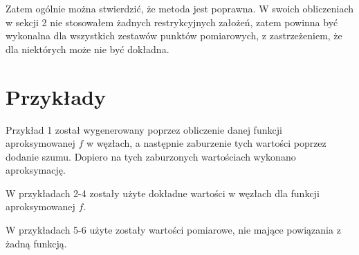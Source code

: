 \documentclass[12pt]{article}
\begin{document}
	Zatem ogólnie można stwierdzić, że metoda jest poprawna. W swoich obliczeniach w sekcji 2 nie stosowałem żadnych restrykcyjnych założeń, zatem powinna być wykonalna dla wszystkich zestawów punktów pomiarowych, z zastrzeżeniem, że dla niektórych może nie być dokładna.
	
	
	
	
	\section{Przykłady}
	Przykład 1 został wygenerowany poprzez obliczenie danej funkcji aproksymowanej $f$ w węzłach, a następnie zaburzenie tych wartości poprzez dodanie szumu. Dopiero na tych zaburzonych wartościach wykonano aproksymację.
	
	W przykładach 2-4 zostały użyte dokładne wartości w węzłach dla funkcji aproksymowanej $f$.
	
	W przykładach 5-6 użyte zostały wartości pomiarowe, nie mające powiązania z żadną funkcją.
	
\end{document}
